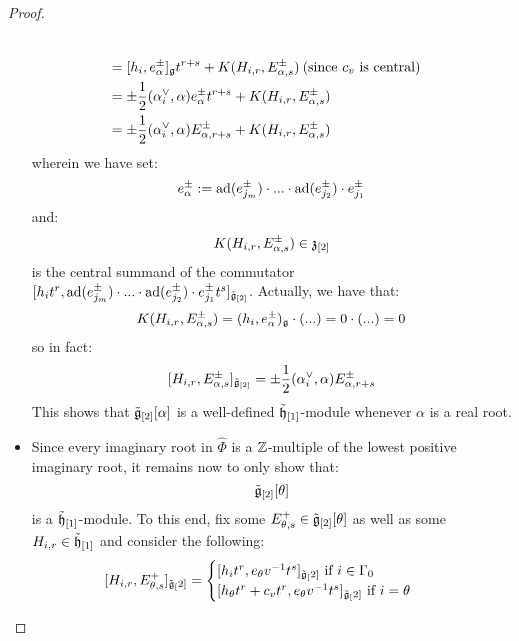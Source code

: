 \begin{proof}
\begin{itemize}
$$\begin{aligned}
                                \\
                                & = [ h_i, e_{\alpha}^{\pm} ]_{\g} t^{r + s} + K(H_{i, r}, E_{\alpha, s}^{\pm}) \: \text{(since $c_v$ is central)}
                                \\
                                & = \pm \frac12 (\alpha_i^{\vee}, \alpha) e_{\alpha}^{\pm} t^{r + s} + K(H_{i, r}, E_{\alpha, s}^{\pm})
                                \\
                                & = \pm \frac12 (\alpha_i^{\vee}, \alpha) E_{\alpha, r + s}^{\pm} + K(H_{i, r}, E_{\alpha, s}^{\pm})
                            \end{aligned}
                        $$
                    wherein we have set:
                        $$e_{\alpha}^{\pm} := \ad(e_{j_m}^{\pm}) \cdot ... \cdot \ad(e_{j_2}^{\pm}) \cdot e_{j_1}^{\pm}$$
                    and:
                        $$K(H_{i, r}, E_{\alpha, s}^{\pm}) \in \z_{[2]}$$
                    is the central summand of the commutator $[ h_i t^r, \ad(e_{j_m}^{\pm}) \cdot ... \cdot \ad(e_{j_2}^{\pm}) \cdot e_{j_1}^{\pm} t^s ]_{\tilde{\g}_{[2]}}$. Actually, we have that:
                        $$K(H_{i, r}, E_{\alpha, s}^{\pm}) = (h_i, e_{\alpha}^{\pm})_{\g} \cdot (...) = 0 \cdot (...) = 0$$
                    so in fact:
                        $$[H_{i, r}, E_{\alpha, s}^{\pm}]_{\tilde{\g}_{[2]}} = \pm \frac12 (\alpha_i^{\vee}, \alpha) E_{\alpha, r + s}^{\pm}$$
                    This shows that $\tilde{\g}_{[2]}[\alpha]$ is a well-defined $\tilde{\h}_{[1]}$-module whenever $\alpha$ is a real root. 
                    \item Since every imaginary root in $\hat{\Phi}$ is a $\Z$-multiple of the lowest positive imaginary root, it remains now to only show that:
                        $$\tilde{\g}_{[2]}[\theta]$$
                    is a $\tilde{\h}_{[1]}$-module. To this end, fix some $E_{\theta, s}^+ \in \tilde{\g}_{[2]}[\theta]$ as well as some $H_{i, r} \in \tilde{\h}_{[1]}$ and consider the following:
                        $$
                            \begin{aligned}
                                [H_{i, r}, E_{\theta, s}^+]_{\tilde{\g}_[2]} & =
                                \begin{cases}
                                    \text{$[h_i t^r, e_{\theta} v^{-1} t^s]_{\tilde{\g}_[2]}$ if $i \in \Gamma_0$}
                                    \\
                                    \text{$[h_{\theta} t^r + c_v t^r, e_{\theta} v^{-1} t^s]_{\tilde{\g}_[2]}$ if $i = \theta$}

\end{cases}
\end{aligned}$$
\end{itemize}
\end{proof}
